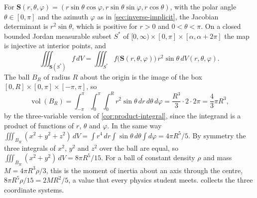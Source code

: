 For  $\mathbf S(r,\theta,\varphi)=(r\sin\theta\cos\varphi,r\sin\theta\sin\varphi,r\cos\theta)$, with the polar angle $\theta\in[0,\pi]$ and the azimuth $\varphi$ as in \cref{sec:inverse-implicit}, the Jacobian determinant is $r^2\sin\theta$, which is positive for $r>0$ and $0<\theta<\pi$. On a closed bounded Jordan measurable subset $S^*$ of $[0,\infty)\times[0,\pi]\times[\alpha,\alpha+2\pi]$ the map is injective at interior points, and
\[
\iiint_{\mathbf S(S^*)}f\,dV=\iiint_{S^*}f\bigl(\mathbf S(r,\theta,\varphi)\bigr)\,r^2\sin\theta\,dV(r,\theta,\varphi).
\]
The ball $B_R$ of radius $R$ about the origin is the image of the box $[0,R]\times[0,\pi]\times[-\pi,\pi]$, so
\[
\operatorname{vol}(B_R)=\int_{-\pi}^\pi\int_0^\pi\int_0^Rr^2\sin\theta\,dr\,d\theta\,d\varphi=\frac{R^3}3\cdot2\cdot2\pi=\frac43\pi R^3 ,
\]
by the three-variable version of \cref{cor:product-integral}, since the integrand is a product of functions of $r$, $\theta$ and $\varphi$. In the same way $\iiint_{B_R}(x^2+y^2+z^2)\,dV=\int r^4\,dr\int\sin\theta\,d\theta\int d\varphi=4\pi R^5/5$. By symmetry the three integrals of $x^2$, $y^2$ and $z^2$ over the ball are equal, so $\iiint_{B_R}(x^2+y^2)\,dV=8\pi R^5/15$. For a ball of constant density $\rho$ and mass $M=4\pi R^3\rho/3$, this is the moment of inertia about an axis through the centre, $8\pi R^5\rho/15=2MR^2/5$, a value that every physics student meets.  collects the three coordinate systems.

\begin{table}
\end{table}

